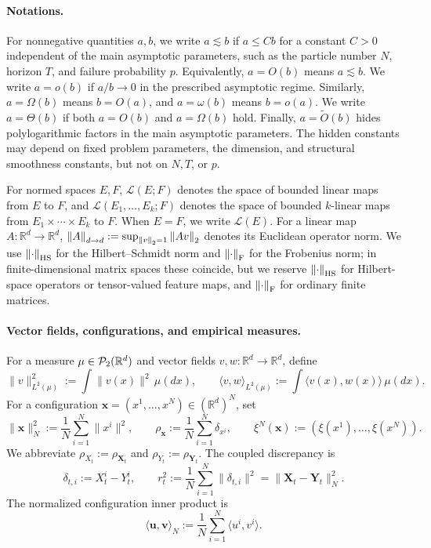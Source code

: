 \paragraph{Notations.}
For nonnegative quantities \(a,b\), we write \(a\lesssim b\) if
\(a\le Cb\) for a constant \(C>0\) independent of the main asymptotic
parameters, such as the particle number \(N\), horizon \(T\), and
failure probability \(p\).  Equivalently, \(a=O(b)\) means \(a\lesssim b\).
We write \(a=o(b)\) if \(a/b\to0\) in the prescribed asymptotic regime.
Similarly, \(a=\Omega(b)\) means \(b=O(a)\), and \(a=\omega(b)\) means
\(b=o(a)\).  We write \(a=\Theta(b)\) if both \(a=O(b)\) and
\(a=\Omega(b)\) hold.  Finally, \(a=\widetilde O(b)\) hides
polylogarithmic factors in the main asymptotic parameters.  The hidden
constants may depend on fixed problem parameters, the dimension, and structural smoothness constants, but not on \(N,T\), or \(p\).

For normed spaces \(E,F\), \(\mathcal L(E;F)\) denotes the space of bounded
linear maps from \(E\) to \(F\), and \(\mathcal L(E_1,\ldots,E_k;F)\) denotes
the space of bounded \(k\)-linear maps from \(E_1\times\cdots\times E_k\) to
\(F\).  When \(E=F\), we write \(\mathcal L(E)\).  For a linear map
\(A:\mathbb R^d\to\mathbb R^d\), 
$
    \norm{A}_{{d}\to{d}}
    :=
    \sup_{\norm{v}_2=1}\norm{Av}_2
$
denotes its Euclidean operator norm.  We use \(\norm{\cdot}_{\mathrm{HS}}\) for the
Hilbert--Schmidt norm and \(\norm{\cdot}_{\mathrm{F}}\) for the Frobenius norm; in
finite-dimensional matrix spaces these coincide, but we reserve
\(\norm{\cdot}_{\mathrm{HS}}\) for Hilbert-space operators or tensor-valued feature
maps, and \(\norm{\cdot}_{\mathrm{F}}\) for ordinary finite matrices.

\paragraph{Vector fields, configurations, and empirical measures.}
For a measure \(\mu\in\mathcal P_2(\mathbb R^d)\) and vector fields
\(v,w:\mathbb R^d\to\mathbb R^d\), define
\[
 \|v\|_{L^2(\mu)}^2:=\int\|v(x)\|^2\,\mu(dx),
 \qquad
 \langle v,w\rangle_{L^2(\mu)}:=\int\langle v(x),w(x)\rangle\,\mu(dx).
\]
For a configuration \(\mathbf x=(x^1,\ldots,x^N)\in(\mathbb R^d)^N\), set
\[
 \|\mathbf x\|_N^2:=\frac1N\sum_{i=1}^N\|x^i\|^2,
 \qquad
 \rho_{\mathbf x}:=\frac1N\sum_{i=1}^N\delta_{x^i},
 \qquad
 \xi^N(\mathbf x):=(\xi(x^1),\ldots,\xi(x^N)).
\]
We abbreviate \(\rho_{X_t}:=\rho_{\mathbf X_t}\) and
\(\rho_{Y_t}:=\rho_{\mathbf Y_t}\). The coupled discrepancy is
\[
 \delta_{t,i}:=X_t^i-Y_t^i,
 \qquad
 r_t^2:=\frac1N\sum_{i=1}^N\|\delta_{t,i}\|^2
       =\|\mathbf X_t-\mathbf Y_t\|_N^2.
\]
The normalized configuration inner product is
\[
 \langle\mathbf u,\mathbf v\rangle_N
 :=\frac1N\sum_{i=1}^N\langle u^i,v^i\rangle.
\]

